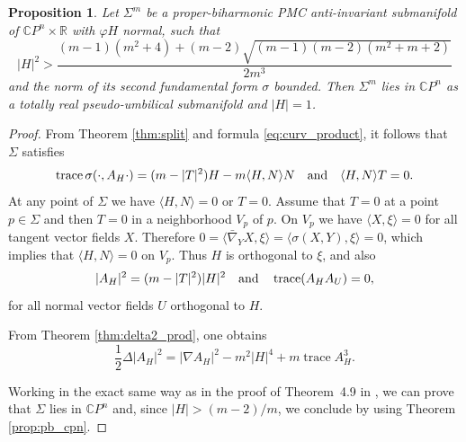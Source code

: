 \documentclass[11pt]{amsart}
\theoremstyle{plain}
\newtheorem{proposition}  [theorem]  {Proposition}
\theoremstyle{definition}
\DeclareMathOperator{\trace}{trace} \DeclareMathOperator{\di}{div}
\numberwithin{equation}{section}
\begin{document}
\begin{proposition} Let $\Sigma^m$ be a proper-biharmonic PMC anti-invariant submanifold of $\mathbb{C}P^n\times\mathbb{R}$ with $\varphi H$ normal, such that 
$$
|H|^2>\frac{(m-1)(m^2+4)+(m-2)\sqrt{(m-1)(m-2)(m^2+m+2)}}{2m^3}
$$
and the norm of its second fundamental form $\sigma$ bounded. Then $\Sigma^m$ lies in $\mathbb{C}P^n$ as a totally real pseudo-umbilical submanifold and $|H|=1$.
\end{proposition}

\begin{proof} From Theorem \ref{thm:split} and formula \eqref{eq:curv_product}, it follows that $\Sigma$ satisfies
$$
\trace\sigma(\cdot,A_H\cdot)=(m-|T|^2)H-m\langle H,N\rangle N\quad\textnormal{and}\quad\langle H,N\rangle T=0.
$$
At any point of $\Sigma$ we have $\langle H,N\rangle=0$ or $T=0$. Assume that $T=0$ at a point $p\in\Sigma$ and then $T=0$ in a neighborhood $V_p$ of $p$. On $V_p$ we have $\langle X,\xi\rangle=0$ for all tangent vector fields $X$. Therefore $0=\langle\bar\nabla_YX,\xi\rangle=\langle\sigma(X,Y),\xi\rangle=0$, which implies that $\langle H,N\rangle=0$ on $V_p$. Thus $H$ is orthogonal to $\xi$, and also
$$
|A_H|^2=(m-|T|^2)|H|^2\quad\textnormal{and}\quad\trace(A_HA_U)=0,
$$
for all normal vector fields $U$ orthogonal to $H$.

From Theorem \ref{thm:delta2_prod}, one obtains
$$
\frac{1}{2}\Delta|A_H|^2=|\nabla A_H|^2-m^2|H|^4+m\trace A_H^3.
$$

Working in the exact same way as in the proof of Theorem~4.9 in \cite{FOR}, we can prove that $\Sigma$ lies in $\mathbb{C}P^n$ and, since $|H|>(m-2)/m$, we conclude by using Theorem \ref{prop:pb_cpn}.
\end{proof}
\end{document}
